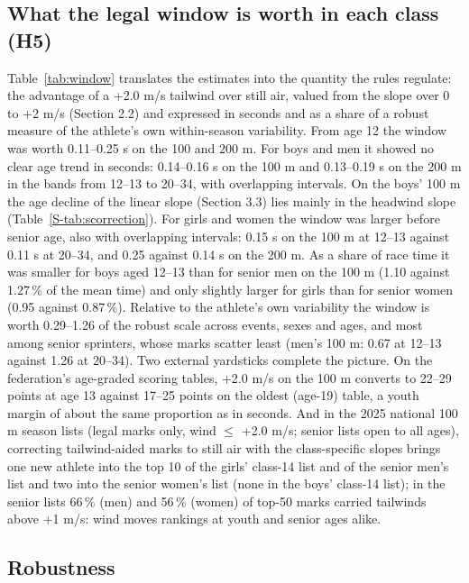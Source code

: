 \documentclass[12pt,a4paper]{article}
\begin{document}
\subsection{What the legal window is worth in each class (H5)}

Table~\ref{tab:window} translates the estimates into the quantity the rules regulate: the advantage of a +2.0 m/s tailwind over still air, valued from the slope over 0 to +2 m/s (Section 2.2) and expressed in seconds and as a share of a robust measure of the athlete's own within-season variability. From age 12 the window was worth 0.11--0.25 s on the 100 and 200 m. For boys and men it showed no clear age trend in seconds: 0.14--0.16 s on the 100 m and 0.13--0.19 s on the 200 m in the bands from 12--13 to 20--34, with overlapping intervals. On the boys' 100 m the age decline of the linear slope (Section 3.3) lies mainly in the headwind slope (Table~\ref{S-tab:scorrection}). For girls and women the window was larger before senior age, also with overlapping intervals: 0.15 s on the 100 m at 12--13 against 0.11 s at 20--34, and 0.25 against 0.14 s on the 200 m. As a share of race time it was smaller for boys aged 12--13 than for senior men on the 100 m (1.10 against 1.27\,\% of the mean time) and only slightly larger for girls than for senior women (0.95 against 0.87\,\%). Relative to the athlete's own variability the window is worth 0.29--1.26 of the robust scale across events, sexes and ages, and most among senior sprinters, whose marks scatter least (men's 100 m: 0.67 at 12--13 against 1.26 at 20--34). Two external yardsticks complete the picture. On the federation's age-graded scoring tables, +2.0 m/s on the 100 m converts to 22--29 points at age 13 against 17--25 points on the oldest (age-19) table, a youth margin of about the same proportion as in seconds. And in the 2025 national 100 m season lists (legal marks only, wind $\leq$ +2.0 m/s; senior lists open to all ages), correcting tailwind-aided marks to still air with the class-specific slopes brings one new athlete into the top 10 of the girls' class-14 list and of the senior men's list and two into the senior women's list (none in the boys' class-14 list); in the senior lists 66\,\% (men) and 56\,\% (women) of top-50 marks carried tailwinds above +1 m/s: wind moves rankings at youth and senior ages alike.

\subsection{Robustness}
\end{document}
